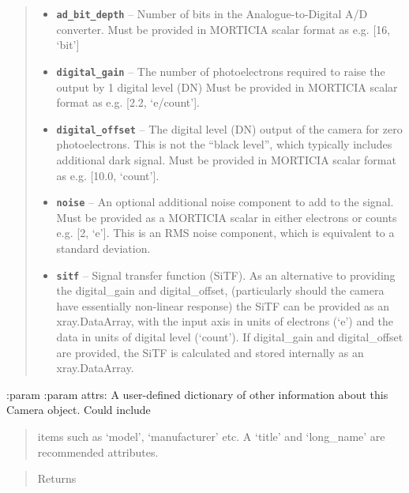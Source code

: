 \documentclass[a4paper,10pt,english]{sphinxmanual}
\begin{document}
\begin{fulllineitems}
\begin{fulllineitems}
\begin{quote}
\begin{description}
\begin{itemize}
\item {} 
\textbf{\texttt{ad\_bit\_depth}} -- Number of bits in the Analogue-to-Digital A/D converter. Must be provided in MORTICIA
scalar format as e.g. {[}16, `bit'{]}

\item {} 
\textbf{\texttt{digital\_gain}} -- The number of photoelectrons required to raise the output by 1 digital level (DN)
Must be provided in MORTICIA scalar format as e.g. {[}2.2, `e/count'{]}.

\item {} 
\textbf{\texttt{digital\_offset}} -- The digital level (DN) output of the camera for zero photoelectrons. This is not
the ``black level'', which typically includes additional dark signal. Must be provided in MORTICIA
scalar format as e.g. {[}10.0, `count'{]}.

\item {} 
\textbf{\texttt{noise}} -- An optional additional noise component to add to the signal. Must be provided as a
MORTICIA scalar in either electrons or counts e.g. {[}2, `e'{]}. This is an RMS noise component,
which is equivalent to a standard deviation.

\item {} 
\textbf{\texttt{sitf}} -- Signal transfer function (SiTF). As an alternative to providing the digital\_gain and
digital\_offset, (particularly should the camera have essentially non-linear response) the SiTF
can be provided as an xray.DataArray, with the input axis in units of electrons (`e') and
the data in units of digital level (`count'). If digital\_gain and digital\_offset are provided,
the SiTF is calculated and stored internally as an xray.DataArray.

\end{itemize}

\end{description}\end{quote}

:param
:param attrs: A user-defined dictionary of other information about this Camera object. Could include
\begin{quote}

items such as `model', `manufacturer' etc. A `title' and `long\_name' are recommended attributes.
\end{quote}
\begin{quote}\begin{description}
\item[{Returns}] \leavevmode


\end{description}\end{quote}

\end{fulllineitems}


\end{fulllineitems}
\end{document}
